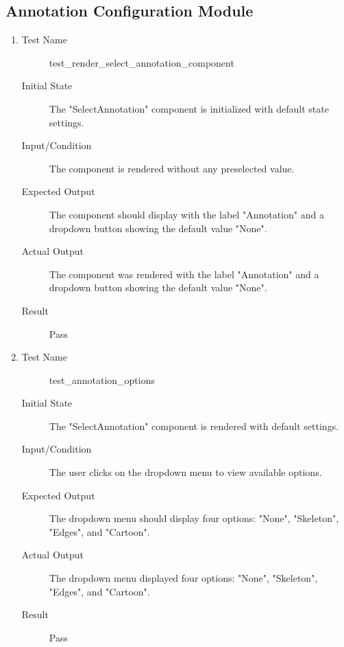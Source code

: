 \documentclass[12pt, titlepage]{article}
\begin{document}
\subsection{Annotation Configuration Module}
\begin{enumerate}[UT-AC1]
  \item \label{UT-AC1}
    \begin{description}
    \item[Test Name] test\_render\_select\_annotation\_component
    \item[Initial State] The "SelectAnnotation" component is initialized with default state settings.
    \item[Input/Condition] The component is rendered without any preselected value.
    \item[Expected Output] The component should display with the label "Annotation" and a dropdown button showing the default value "None".
    \item[Actual Output] The component was rendered with the label "Annotation" and a dropdown button showing the default value "None".
    \item[Result] Pass
    \end{description}
  \item \label{UT-AC2}
    \begin{description}
    \item[Test Name] test\_annotation\_options
    \item[Initial State] The "SelectAnnotation" component is rendered with default settings.
    \item[Input/Condition] The user clicks on the dropdown menu to view available options.
    \item[Expected Output] The dropdown menu should display four options: "None", "Skeleton", "Edges", and "Cartoon".
    \item[Actual Output] The dropdown menu displayed four options: "None", "Skeleton", "Edges", and "Cartoon".
    \item[Result] Pass
    \end{description}
\end{enumerate}
\end{document}
